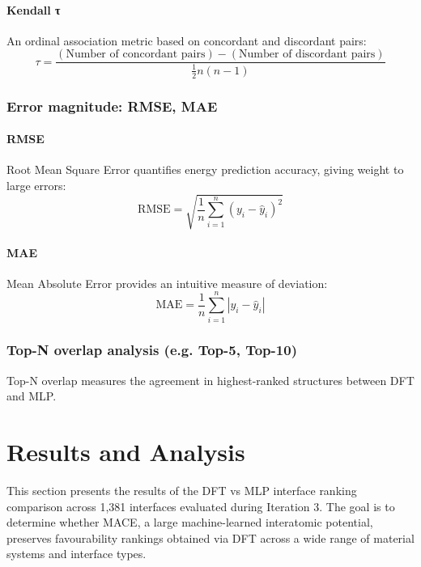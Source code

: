 \paragraph{Kendall τ}

An ordinal association metric based on concordant and discordant pairs: \[ \tau = \frac{(\text{Number of concordant pairs}) - (\text{Number of discordant pairs})}{\frac{1}{2}n(n-1)} \]

\subsubsection{Error magnitude: RMSE, MAE}

\paragraph{RMSE}

Root Mean Square Error quantifies energy prediction accuracy, giving weight to large errors: \[ \text{RMSE} = \sqrt{\frac{1}{n} \sum_{i=1}^{n} (y_i - \hat{y}_i)^2} \]

\paragraph{MAE}

Mean Absolute Error provides an intuitive measure of deviation: \[ \text{MAE} = \frac{1}{n} \sum_{i=1}^{n} |y_i - \hat{y}_i| \]

\subsubsection{Top-N overlap analysis (e.g. Top-5, Top-10)}

Top-N overlap measures the agreement in highest-ranked structures between DFT and MLP.


\section{Results and Analysis} \label{section:results_and_analysis}

This section presents the results of the DFT vs MLP interface ranking comparison across 1,381 interfaces evaluated during Iteration 3. The goal is to determine whether MACE, a large machine-learned interatomic potential, preserves favourability rankings obtained via DFT across a wide range of material systems and interface types.

